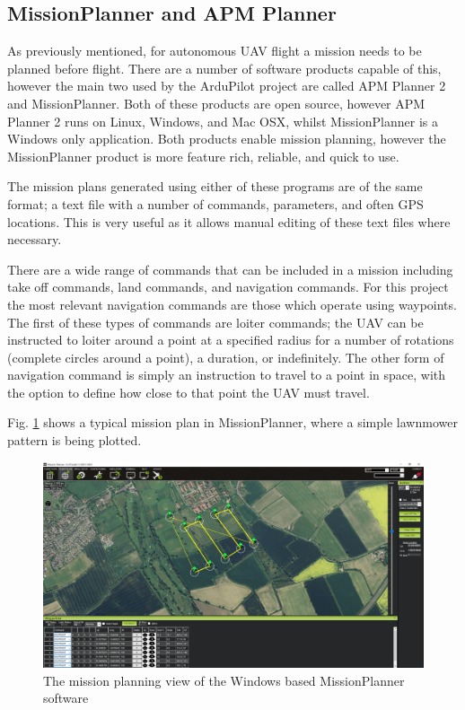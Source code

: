 \subsection{MissionPlanner and APM Planner}
\label{intro:planner}

As previously mentioned, for autonomous UAV flight a mission needs to be planned before flight. There are a number of software products capable of this, however the main two used by the ArduPilot project are called APM Planner 2 and MissionPlanner. Both of these products are open source, however APM Planner 2 runs on Linux, Windows, and Mac OSX, whilst MissionPlanner is a Windows only application. Both products enable mission planning, however the MissionPlanner product is more feature rich, reliable, and quick to use. 

The mission plans generated using either of these programs are of the same format; a text file with a number of commands, parameters, and often GPS locations. This is very useful as it allows manual editing of these text files where necessary.

There are a wide range of commands that can be included in a mission including take off commands, land commands, and navigation commands. For this project the most relevant navigation commands are those which operate using waypoints. The first of these types of commands are loiter commands; the UAV can be instructed to loiter around a point at a specified radius for a number of rotations (complete circles around a point), a duration, or indefinitely. The other form of navigation command is simply an instruction to travel to a point in space, with the option to define how close to that point the UAV must travel. 

Fig. \ref{fig:missionplanner} shows a typical mission plan in MissionPlanner, where a simple lawnmower pattern is being plotted. 

\begin{figure}[htbp!] 
\centering    
\includegraphics[width=\textwidth]{MissionPlanner}
\caption[MissionPlanner desktop software]{The mission planning view of the Windows based MissionPlanner software}
\label{fig:missionplanner}
\end{figure}

